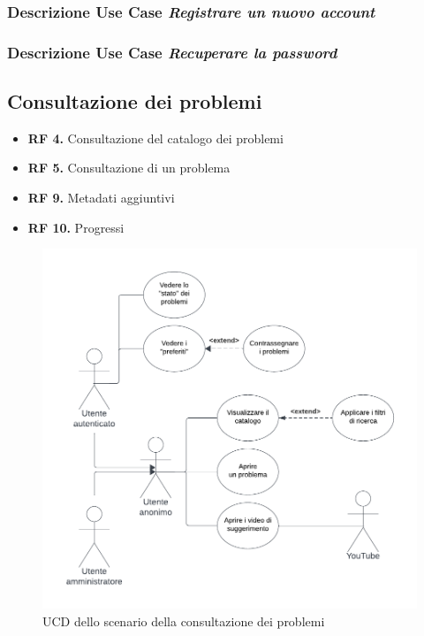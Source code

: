 \documentclass[11pt, a4paper]{article}
\theoremstyle{definition}
\begin{document}
\subsubsection*{Descrizione Use Case \textit{Registrare un nuovo account}}
\subsubsection*{Descrizione Use Case \textit{Recuperare la password}}



\newpage
\subsection{Consultazione dei problemi}
\begin{itemize}
    \item \textbf{RF 4.} Consultazione del catalogo dei problemi
    \item \textbf{RF 5.} Consultazione di un problema
    \item \textbf{RF 9.} Metadati aggiuntivi
    \item \textbf{RF 10.} Progressi
\end{itemize}

\begin{figure}[H]
\centering
\includegraphics[scale=0.81]{materiale/consulta-catalogo.pdf}
\caption{UCD dello scenario della consultazione dei problemi}
\end{figure}
\end{document}
